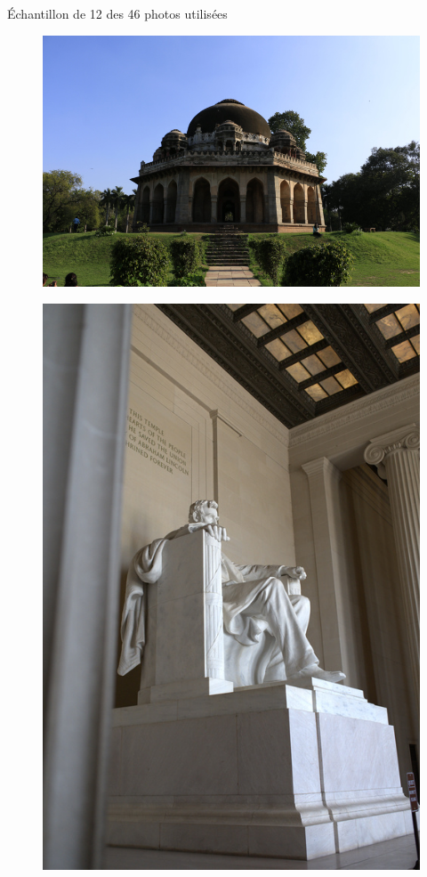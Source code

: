 \documentclass[xcolor=dvipsnames]{beamer}
\begin{document}
\begin{frame}{Échantillon de 12 des 46 photos utilisées}
\begin{minipage}{.23\textwidth}
\begin{figure}
            \includegraphics[width=1\linewidth]{photos_utilises/23.jpg}
        \end{figure}
    \end{minipage}
    \hfill
    \begin{minipage}{.23\textwidth}
        \centering
        \begin{figure}
            \includegraphics[width=.75\linewidth]{photos_utilises/35.jpg}

\end{figure}
\end{minipage}
\end{frame}
\end{document}
